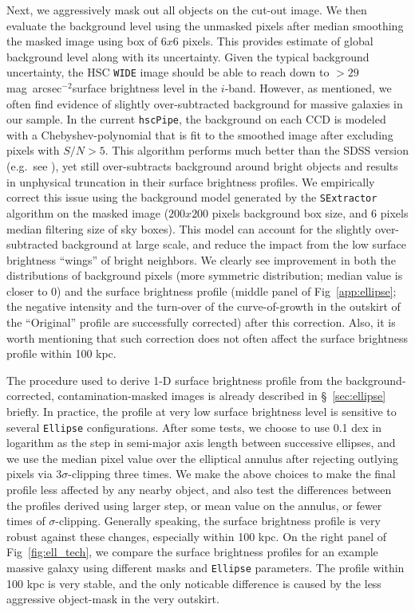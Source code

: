 \documentclass[a4paper,fleqn,usenatbib]{mnras}
\def\sb{mag~arcsec$^{-2}$}
\begin{document}
    Next, we aggressively mask out all objects on the cut-out image.  
    We then evaluate the background level using the unmasked pixels after median 
    smoothing the masked image using box of $6x6$ pixels.
    This provides estimate of global background level along with its uncertainty. 
    Given the typical background uncertainty, the HSC \texttt{WIDE} image should be 
    able to reach down to $> 29$ \sb surface brightness level in the $i$-band.  
    However, as mentioned, we often find evidence of slightly over-subtracted 
    background for massive galaxies in our sample. 
    In the current \texttt{hscPipe}, the background on each CCD is modeled with a 
    Chebyshev-polynomial that is fit to the smoothed image after excluding pixels 
    with $S/N >5$.
    This algorithm performs much better than the SDSS version 
    (e.g.\ see \citealt{Blanton2011}), yet still over-subtracts background around 
    bright objects and results in unphysical truncation in their surface brightness 
    profiles.
    We empirically correct this issue using the background model generated by 
    the \texttt{SExtractor} algorithm on the masked image 
    ($200x200$ pixels background box size, and 6 pixels median filtering size of 
    sky boxes).
    This model can account for the slightly over-subtracted background at large scale,
    and reduce the impact from the low surface brightness ``wings'' of bright 
    neighbors. 
    We clearly see improvement in both the distributions of background pixels 
    (more symmetric distribution; median value is closer to 0) and the surface 
    brightness profile (middle panel of Fig~\ref{app:ellipse}; the negative intensity 
    and the turn-over of the curve-of-growth in the outskirt of the ``Original'' 
    profile are successfully corrected) after this correction.
    Also, it is worth mentioning that such correction does not often affect the 
    surface brightness profile within 100 kpc. 
    
    The procedure used to derive 1-D surface brightness profile from the 
    background-corrected, contamination-masked images is already described in 
    \S~\ref{sec:ellipse} briefly. 
    In practice, the profile at very low surface brightness level is sensitive to 
    several \texttt{Ellipse} configurations.
    After some tests, we choose to use 0.1 dex in logarithm as the step in semi-major 
    axis length between successive ellipses, and we use the median pixel value over the
    elliptical annulus after rejecting outlying pixels via $3\sigma$-clipping three
    times.
    We make the above choices to make the final profile less affected by any nearby
    object, and also test the differences between the profiles derived using larger
    step, or mean value on the annulus, or fewer times of $\sigma$-clipping. 
    Generally speaking, the surface brightness profile is very robust against these
    changes, especially within 100 kpc. 
    On the right panel of Fig~\ref{fig:ell_tech}, we compare the surface brightness
    profiles for an example massive galaxy using different masks and \texttt{Ellipse}
    parameters. 
    The profile within 100 kpc is very stable, and the only noticable difference 
    is caused by the less aggressive object-mask in the very outskirt.    
    
\end{document}

